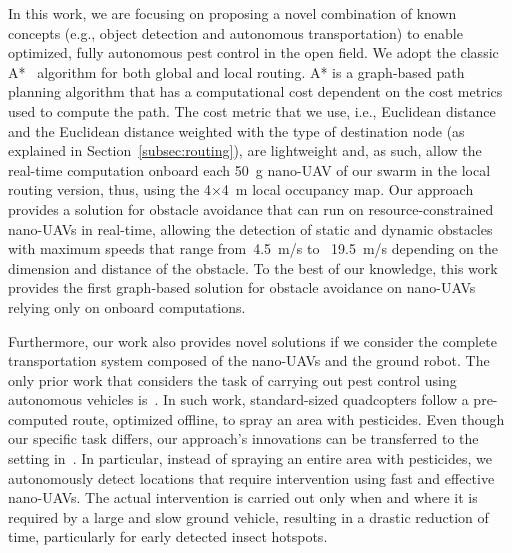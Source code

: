 In this work, we are focusing on proposing a novel combination of known concepts (e.g., object detection and autonomous transportation) to enable optimized, fully autonomous pest control in the open field.
We adopt the classic A*~\citep{hart1968formal} algorithm for both global and local routing.
A* is a graph-based path planning algorithm that has a computational cost dependent on the cost metrics used to compute the path.
The cost metric that we use, i.e., Euclidean distance and the Euclidean distance weighted with the type of destination node (as explained in Section~\ref{subsec:routing}), are lightweight and, as such, allow the real-time computation onboard each \SI{50}{\gram} nano-UAV of our swarm in the local routing version, thus, using the 4$\times$\SI{4}{\meter} local occupancy map.
Our approach provides a solution for obstacle avoidance that can run on resource-constrained nano-UAVs in real-time, allowing the detection of static and dynamic obstacles with maximum speeds that range from~\SI{4.5}{\meter/\second} to ~\SI{19.5}{\meter/\second} depending on the dimension and distance of the obstacle.
To the best of our knowledge, this work provides the first graph-based solution for obstacle avoidance on nano-UAVs relying only on onboard computations.


Furthermore, our work also provides novel solutions if we consider the complete transportation system composed of the nano-UAVs and the ground robot. 
The only prior work that considers the task of carrying out pest control using autonomous vehicles is~\citet{du2017precision}. 
In such work, standard-sized quadcopters follow a pre-computed route, optimized offline, to spray an area with pesticides. 
Even though our specific task differs, our approach's innovations can be transferred to the setting in~\citet{du2017precision}. 
In particular, instead of spraying an entire area with pesticides, we autonomously detect locations that require intervention using fast and effective nano-UAVs. 
The actual intervention is carried out only when and where it is required by a large and slow ground vehicle, resulting in a drastic reduction of time, particularly for early detected insect hotspots.